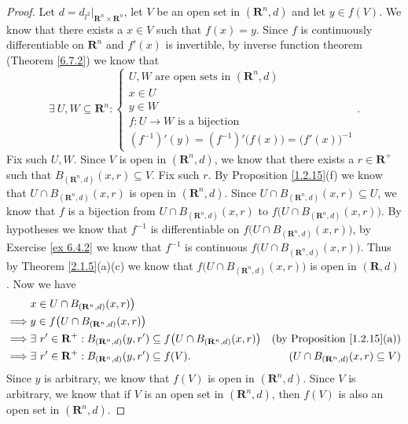 \begin{proof}
    Let \(d = d_{l^2}|_{\mathbf{R}^n \times \mathbf{R}^n}\), let \(V\) be an open set in \((\mathbf{R}^n, d)\) and let \(y \in f(V)\).
    We know that there exists a \(x \in V\) such that \(f(x) = y\).
    Since \(f\) is continuously differentiable on \(\mathbf{R}^n\) and \(f'(x)\) is invertible, by inverse function theorem (Theorem \ref{6.7.2}) we know that
    \[
        \exists\ U, W \subseteq \mathbf{R}^n : \begin{cases}
            U, W \text{ are open sets in } (\mathbf{R}^n, d) \\
            x \in U                                          \\
            y \in W                                          \\
            f : U \to W \text{ is a bijection}               \\
            (f^{-1})'(y) = (f^{-1})'\big(f(x)\big) = \big(f'(x)\big)^{-1}
        \end{cases}.
    \]
    Fix such \(U, W\).
    Since \(V\) is open in \((\mathbf{R}^n, d)\), we know that there exists a \(r \in \mathbf{R}^+\) such that \(B_{(\mathbf{R}^n, d)}(x, r) \subseteq V\).
    Fix such \(r\).
    By Proposition \ref{1.2.15}(f) we know that \(U \cap B_{(\mathbf{R}^n, d)}(x, r)\) is open in \((\mathbf{R}^n, d)\).
    Since \(U \cap B_{(\mathbf{R}^n, d)}(x, r) \subseteq U\), we know that \(f\) is a bijection from \(U \cap B_{(\mathbf{R}^n, d)}(x, r)\) to \(f\big(U \cap B_{(\mathbf{R}^n, d)}(x, r)\big)\).
    By hypotheses we know that \(f^{-1}\) is differentiable on \(f\big(U \cap B_{(\mathbf{R}^n, d)}(x, r)\big)\), by Exercise \ref{ex 6.4.2} we know that \(f^{-1}\) is continuous \(f\big(U \cap B_{(\mathbf{R}^n, d)}(x, r)\big)\).
    Thus by Theorem \ref{2.1.5}(a)(c) we know that \(f\big(U \cap B_{(\mathbf{R}^n, d)}(x, r)\big)\) is open in \((\mathbf{R}, d)\).
    Now we have
    \begin{align*}
                 & x \in U \cap B_{(\mathbf{R}^n, d)}(x, r)\big)                                                                                                                          \\
        \implies & y \in f\big(U \cap B_{(\mathbf{R}^n, d)}(x, r)\big)                                                                                                                    \\
        \implies & \exists\ r' \in \mathbf{R}^+ : B_{(\mathbf{R}^n, d)}(y, r') \subseteq f\big(U \cap B_{(\mathbf{R}^n, d)}(x, r)\big) & \text{(by Proposition \ref{1.2.15}(a))}          \\
        \implies & \exists\ r' \in \mathbf{R}^+ : B_{(\mathbf{R}^n, d)}(y, r') \subseteq f(V).                                         & (U \cap B_{(\mathbf{R}^n, d)}(x, r) \subseteq V)
    \end{align*}
    Since \(y\) is arbitrary, we know that \(f(V)\) is open in \((\mathbf{R}^n, d)\).
    Since \(V\) is arbitrary, we know that if \(V\) is an open set in \((\mathbf{R}^n, d)\), then \(f(V)\) is also an open set in \((\mathbf{R}^n, d)\).
\end{proof}

